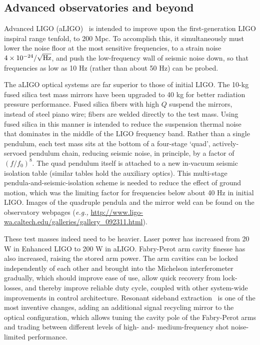         \subsection{Advanced observatories and beyond}
        \label{advanced}
  
	Advanced LIGO (aLIGO)~\cite{aLIGOrefDesign,aLIGOsysDesign} is intended to improve upon the first-generation LIGO inspiral range tenfold, to 200 Mpc.
To accomplish this, it simultaneously must lower the noise floor at the most sensitive frequencies, to a strain noise  $4\times10^{-24}/\sqrt{\textup{Hz}}$, and push the low-frequency wall of seismic noise down, so that frequencies as low as 10 Hz (rather than about 50 Hz) can be probed.

The aLIGO optical systems are far superior to those of initial LIGO.
The 10-kg fused silica test mass mirrors have been upgraded to 40 kg for better radiation pressure performance.
Fused silica fibers with high $Q$ suspend the mirrors, instead of steel piano wire; fibers are welded directly to the test mass.
Using fused silica in this manner is intended to reduce the suspension thermal noise that dominates in the middle of the LIGO frequency band.
Rather than a single pendulum, each test mass sits at the bottom of a four-stage `quad', actively-servoed pendulum chain, reducing seismic noise, in principle, by a factor of $(f/f_0)^8$.
The quad pendulum itself is attached to a new in-vacuum seismic isolation table (similar tables hold the auxiliary optics).
This multi-stage pendula-and-seismic-isolation scheme is needed to reduce the effect of ground motion, which was the limiting factor for frequencies below about 40 Hz in initial LIGO.
Images of the quadruple pendula and the mirror weld can be found on the observatory webpages (\textit{e.g.,} \url{http://www.ligo-wa.caltech.edu/galleries/gallery_092311.html}).

These test masses indeed need to be heavier.
Laser power has increased from 20 W in Enhanced LIGO to 200 W in aLIGO.
Fabry-Perot arm cavity finesse has also increased, raising the stored arm power.
The arm cavities can be locked independently of each other and brought into the Michelson interferometer gradually, which should improve ease of use, allow quick recovery from lock-losses, and thereby improve reliable duty cycle, coupled with other system-wide improvements in control architecture.
Resonant sideband extraction~\cite{Saulson,aLIGOsysDesign} is one of the most inventive changes, adding an additional signal recycling mirror to the optical configuration, which allows tuning the cavity pole of the Fabry-Perot arms and trading between different levels of high- and- medium-frequency shot noise-limited performance.

